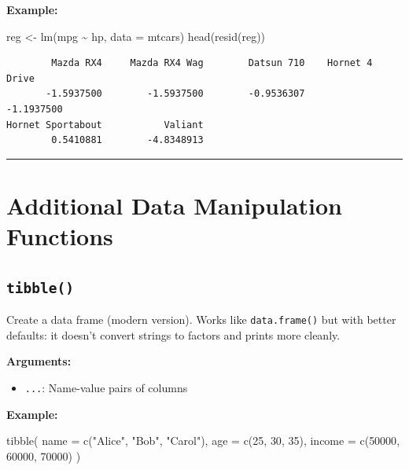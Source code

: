 \documentclass[
  letterpaper,
  DIV=11,
  numbers=noendperiod]{scrreprt}
\newenvironment{Shaded}{\begin{snugshade}}{\end{snugshade}}
\newcommand{\AttributeTok}[1]{\textcolor[rgb]{0.40,0.45,0.13}{#1}}
\newcommand{\DecValTok}[1]{\textcolor[rgb]{0.68,0.00,0.00}{#1}}
\newcommand{\FunctionTok}[1]{\textcolor[rgb]{0.28,0.35,0.67}{#1}}
\newcommand{\NormalTok}[1]{\textcolor[rgb]{0.00,0.23,0.31}{#1}}
\newcommand{\OtherTok}[1]{\textcolor[rgb]{0.00,0.23,0.31}{#1}}
\newcommand{\SpecialCharTok}[1]{\textcolor[rgb]{0.37,0.37,0.37}{#1}}
\newcommand{\StringTok}[1]{\textcolor[rgb]{0.13,0.47,0.30}{#1}}
\providecommand{\tightlist}{%
  \setlength{\itemsep}{0pt}\setlength{\parskip}{0pt}}
\begin{document}
\textbf{Example:}

\begin{Shaded}
\begin{Highlighting}[]
\NormalTok{reg }\OtherTok{\textless{}{-}} \FunctionTok{lm}\NormalTok{(mpg }\SpecialCharTok{\textasciitilde{}}\NormalTok{ hp, }\AttributeTok{data =}\NormalTok{ mtcars)}
\FunctionTok{head}\NormalTok{(}\FunctionTok{resid}\NormalTok{(reg))}
\end{Highlighting}
\end{Shaded}

\begin{verbatim}
        Mazda RX4     Mazda RX4 Wag        Datsun 710    Hornet 4 Drive 
       -1.5937500        -1.5937500        -0.9536307        -1.1937500 
Hornet Sportabout           Valiant 
        0.5410881        -4.8348913 
\end{verbatim}

\begin{center}\rule{0.5\linewidth}{0.5pt}\end{center}

\section{Additional Data Manipulation
Functions}\label{additional-data-manipulation-functions}

\subsection{\texorpdfstring{\texttt{tibble()}}{tibble()}}\label{tibble}

Create a data frame (modern version). Works like \texttt{data.frame()}
but with better defaults: it doesn't convert strings to factors and
prints more cleanly.

\textbf{Arguments:}

\begin{itemize}
\tightlist
\item
  \texttt{...}: Name-value pairs of columns
\end{itemize}

\textbf{Example:}

\begin{Shaded}
\begin{Highlighting}[]
\FunctionTok{tibble}\NormalTok{(}
  \AttributeTok{name =} \FunctionTok{c}\NormalTok{(}\StringTok{"Alice"}\NormalTok{, }\StringTok{"Bob"}\NormalTok{, }\StringTok{"Carol"}\NormalTok{),}
  \AttributeTok{age =} \FunctionTok{c}\NormalTok{(}\DecValTok{25}\NormalTok{, }\DecValTok{30}\NormalTok{, }\DecValTok{35}\NormalTok{),}
  \AttributeTok{income =} \FunctionTok{c}\NormalTok{(}\DecValTok{50000}\NormalTok{, }\DecValTok{60000}\NormalTok{, }\DecValTok{70000}\NormalTok{)}
\NormalTok{)}
\end{Highlighting}
\end{Shaded}
\end{document}
